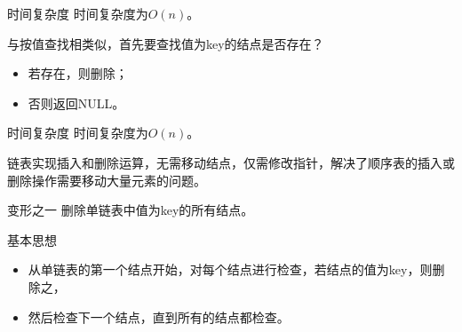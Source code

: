 \begin{frame}[fragile]\ft{\subsecname}
\begin{block}{时间复杂度}
时间复杂度为$O(n)$。
\end{block}

\end{frame}


\begin{frame}\ft{\subsecname}

 
与按值查找相类似，首先要查找值为{\ttfamily key}的结点是否存在？
\begin{itemize}
\item 若存在，则删除；
\item 否则返回{\ttfamily NULL}。
\end{itemize}

\end{frame}

\begin{frame}[fragile]\ft{\subsecname}
  
\end{frame}

\begin{frame}[fragile]

  \begin{block}{时间复杂度}
    时间复杂度为$O(n)$。
  \end{block}
\end{frame}

\begin{frame}[fragile]\ft{\subsecname}
链表实现插入和删除运算，无需移动结点，仅需修改指针，解决了顺序表的插入或删除操作需要移动大量元素的问题。
\end{frame}

\begin{frame}[fragile]\ft{\subsecname}
\begin{block}{变形之一}
删除单链表中值为key的所有结点。
\end{block}
\pause 
\begin{block}{基本思想}
\begin{itemize}
\item
从单链表的第一个结点开始，对每个结点进行检查，若结点的值为{\ttfamily key}，则删除之，
\item
然后检查下一个结点，直到所有的结点都检查。
\end{itemize}
\end{block}


\end{frame}


